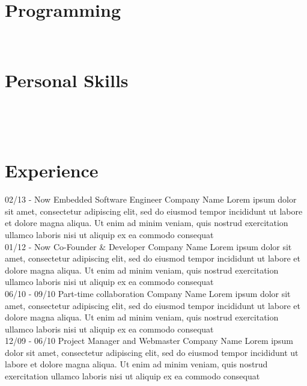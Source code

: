 \documentclass[]{friggeri-cv}
\begin{document}
\begin{aside}
  \section{Programming}
    ~
  \section{Personal Skills}
    ~
\end{aside}
~
\section{Experience}
\begin{entrylist}
  \entry
    {02/13 - Now}
    {Embedded Software Engineer}
    {Company Name}
    {Lorem ipsum dolor sit amet, consectetur adipiscing elit, sed do eiusmod tempor incididunt ut labore et dolore magna aliqua. Ut enim ad minim veniam, quis nostrud exercitation ullamco laboris nisi ut aliquip ex ea commodo consequat\\}
  \entry
    {01/12 - Now}
    {Co-Founder \& Developer}
    {Company Name}
    {Lorem ipsum dolor sit amet, consectetur adipiscing elit, sed do eiusmod tempor incididunt ut labore et dolore magna aliqua. Ut enim ad minim veniam, quis nostrud exercitation ullamco laboris nisi ut aliquip ex ea commodo consequat\\}
    \entry
    {06/10 - 09/10}
    {Part-time collaboration}
    {Company Name}
    {Lorem ipsum dolor sit amet, consectetur adipiscing elit, sed do eiusmod tempor incididunt ut labore et dolore magna aliqua. Ut enim ad minim veniam, quis nostrud exercitation ullamco laboris nisi ut aliquip ex ea commodo consequat\\}
    \entry
    {12/09 - 06/10}
    {Project Manager and Webmaster}
    {Company Name}
    {Lorem ipsum dolor sit amet, consectetur adipiscing elit, sed do eiusmod tempor incididunt ut labore et dolore magna aliqua. Ut enim ad minim veniam, quis nostrud exercitation ullamco laboris nisi ut aliquip ex ea commodo consequat}
\end{entrylist}
\\
\end{document}
